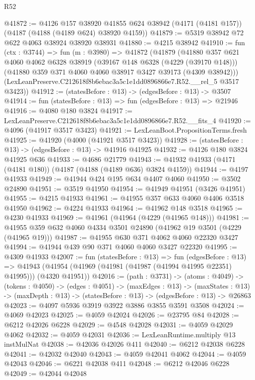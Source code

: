 \begin{lexlean}{R52}
\begin{coremodule}
@41872 := @4126
    @157
    @38920
    @41855
    @624
    @38942
    (@4171 (@4181 @157))
    (@4187 (@4188 (@4189 @624) @38920 @4159))
@41879 := @5319 @38942 @72 @622 @4063 @38924 @38920 @38931
@41880 := @4215 @38942
@41910 := fun (ctx : @3744) =>
  fun (m : @3980) =>
  @41872
    (@41879
      (@41880
        @357
        @621
        @4060
        @4062
        @6328
        @38919
        (@39167 @148 @6328 (@4229 (@39170 @148)))
        (@41880 @359 @371 @4060 @4060 @38917 @3427 @39173 (@4309 @38942)))
      (LexLeanPreserve.C212618f8b6ebac3a5c1e1dd0896866e7.R52.__rel_5 @3517 @3423))
@41912 := (statesBefore : @13) -> (edgesBefore : @13) -> @3507
@41914 := fun (statesBefore : @13) => fun (edgesBefore : @13) => @21946
@41916 := @4080 @180 @3824
@41917 := LexLeanPreserve.C212618f8b6ebac3a5c1e1dd0896866e7.R52.__fits_4
@41920 := @4096 (@41917 @3517 @3423)
@41921 := LexLeanBoot.PropositionTerms.fresh
@41925 := @41920 (@4000 (@41921 @3517 @3423))
@41928 := (statesBefore : @13) -> (edgesBefore : @13) -> @41916 @41925
@41932 := @4126 @180 @3824 @41925 @636
@41933 := @4686 @21779
@41943 := @41932 @41933 (@4171 (@4181 @180)) (@4187 (@4188 (@4189 @636) @3824 @4159))
@41944 := @4197 @41933
@41949 := @41944 @424 @195 @634 @4407 @4060
@41950 := @3502 @24890
@41951 := @3519 @41950
@41954 := @41949 @41951 (@3426 @41951)
@41955 := @4215 @41933
@41961 := @41955 @357 @633 @4060 @4406 @3518 @41950
@41962 := @4224 @41933
@41964 := @41962 @148 @3518
@41965 := @4230 @41933
@41969 := @41961 (@41964 (@4229 (@41965 @148)))
@41981 := @41955 @359 @632 @4060 @4334 @3501 @24890 (@41962 @19 @3501 (@4229 (@41965 @19)))
@41987 := @41955 @630 @371 @4062 @4060 @22320 @3427
@41994 := @41944 @439 @90 @371 @4060 @4060 @3427 @22320
@41995 := @4309 @41933
@42007 := fun (statesBefore : @13) =>
  fun (edgesBefore : @13) =>
  @41943 (@41954 (@41969 (@41981 (@41987 (@41994 @41995 @22351) @41995))) (@4320 @41951))
@42016 := (path : @3731) ->
  (atoms : @4049) ->
  (tokens : @4050) ->
  (edges : @4051) ->
  (maxEdges : @13) ->
  (maxStates : @13) -> (maxDepth : @13) -> (statesBefore : @13) -> (edgesBefore : @13) -> @26863
@42023 := @4097 @5936 @3919 @3922 @3886 @3855 @3591 @3508
@42024 := @4069 @42023
@42025 := @4059 @42024
@42026 := @23795 @84
@42028 := @6212 @42026 @6228
@42029 := @4548 @42028
@42031 := @4059 @42029 @4062
@42032 := @4059 @42031
@42036 := LexLeanRuntime.multiply @13 instMulNat
@42038 := @42036 @42026 @411
@42040 := @6212 @42038 @6228
@42041 := @42032 @42040
@42043 := @4059 @42041 @4062
@42044 := @4059 @42043
@42046 := @6221 @42038 @411
@42048 := @6212 @42046 @6228
@42049 := @42044 @42048

\end{coremodule}
\end{lexlean}
